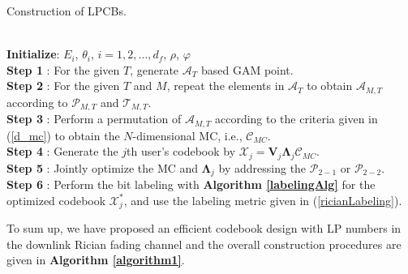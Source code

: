 \documentclass[journal]{IEEEtran}
\begin{document}
 \begin{algorithm}[t] 
\caption{Construction of LPCBs.}
\label{algorithm1}
\begin{algorithmic}[1]
\\
\STATE  \textbf{Initialize}: $E_i$, $\theta_i$, $i=1,2,\ldots, d_f$,  $\rho$, $\varphi$ \\
\STATE   \textbf{Step 1} : For the given $T$, generate   $\mathcal A _{T}$ based GAM point.\\
\STATE   \textbf{Step 2} :  For the given $T$ and $M$, repeat the elements in $\mathcal A _{T}$ to obtain   $\mathcal A _{{M,T}}$ according to  $\mathcal P_{M,T}$ and  $\mathcal T_{M,T}$.\\
\STATE   \textbf{Step 3} : Perform  a permutation of  $\mathcal A _{{M,T}}$ according to the criteria given in (\ref{d_mc}) to obtain the $N$-dimensional MC, i.e.,  $\boldsymbol {\mathcal C}_{MC}$.\\
\STATE   \textbf{Step 4} : Generate the $j$th user's codebook  by $\boldsymbol{\mathcal X}_{j} = \mathbf {V}_{j} \mathbf{\Lambda}_j \boldsymbol {\mathcal C}_{MC}$.\\
\STATE   \textbf{Step 5} :  Jointly optimize the MC and  $\mathbf{\Lambda}_j$ by addressing the $\mathcal {P}_{2-1}$ or $\mathcal {P}_{2-2}$.   \\
\STATE   \textbf{Step 6} :  Perform  the bit labeling  with  \textbf{Algorithm \ref{labelingAlg}} for the optimized codebook $\boldsymbol{\mathcal X}_{j}^\ast$, and use the labeling metric given in (\ref{ricianLabeling}).
\end{algorithmic}
\end{algorithm}
 



 

 
 

To sum up, %
we have proposed an efficient codebook design with LP numbers in the downlink Rician fading channel  and the overall construction procedures are given in \textbf{ Algorithm \ref{algorithm1}}. %
\end{document}
